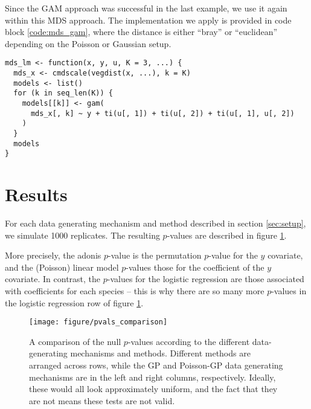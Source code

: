 \documentclass{article}
\newenvironment{code}{\captionsetup{type=listing}}{}
\begin{document}
Since the GAM approach was successful in the last example, we use it again
within this MDS approach. The implementation we apply is provided in code block
\ref{code:mds_gam}, where the distance is either ``bray'' or ``euclidean''
depending on the Poisson or Gaussian setup.

\begin{code}
\begin{verbatim}
mds_lm <- function(x, y, u, K = 3, ...) {
  mds_x <- cmdscale(vegdist(x, ...), k = K)
  models <- list()
  for (k in seq_len(K)) {
    models[[k]] <- gam(
      mds_x[, k] ~ y + ti(u[, 1]) + ti(u[, 2]) + ti(u[, 1], u[, 2])
    )
  }
  models
}
\end{verbatim}
\label{code:gam}
\end{code}

\section{Results}
\label{sec:results}

For each data generating mechanism and method described in section
\ref{sec:setup}, we simulate 1000 replicates. The resulting $p$-values are
described in figure \ref{fig:pvals_comparison}.

More precisely, the adonis $p$-value is the permutation $p$-value for the $y$
covariate, and the (Poisson) linear model $p$-values those for the coefficient
of the $y$ covariate. In contrast, the $p$-values for the logistic regression
are those associated with coefficients for each species -- this is why there are
so many more $p$-values in the logistic regression row of figure
\ref{fig:pvals_comparison}.

\begin{figure}
  \centering
  \texttt{[image: figure/pvals\_comparison]}
  \caption{\label{fig:pvals_comparison} A comparison of the null $p$-values
    according to the different data-generating mechanisms and methods. Different
    methods are arranged across rows, while the GP and Poisson-GP data
    generating mechanisms are in the left and right columns, respectively.
    Ideally, these would all look approximately uniform, and the fact that they
    are not means these tests are not valid.}
\end{figure}
\end{document}
